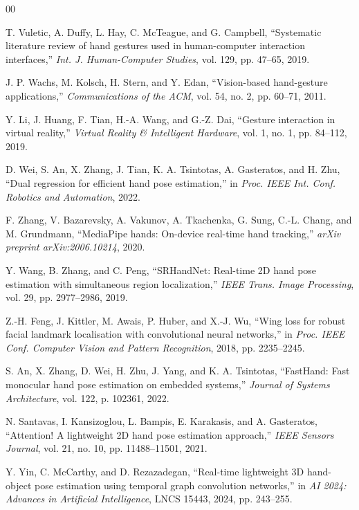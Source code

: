 ﻿\documentclass[10pt,letterpaper]{article}
\begin{document}
\clearpage
\begin{thebibliography}{00}

T. Vuletic, A. Duffy, L. Hay, C. McTeague, and G. Campbell, ``Systematic literature review of hand gestures used in human-computer interaction interfaces,'' \emph{Int. J. Human-Computer Studies}, vol. 129, pp. 47--65, 2019.

J. P. Wachs, M. Kolsch, H. Stern, and Y. Edan, ``Vision-based hand-gesture applications,'' \emph{Communications of the ACM}, vol. 54, no. 2, pp. 60--71, 2011.

Y. Li, J. Huang, F. Tian, H.-A. Wang, and G.-Z. Dai, ``Gesture interaction in virtual reality,'' \emph{Virtual Reality \& Intelligent Hardware}, vol. 1, no. 1, pp. 84--112, 2019.

D. Wei, S. An, X. Zhang, J. Tian, K. A. Tsintotas, A. Gasteratos, and H. Zhu, ``Dual regression for efficient hand pose estimation,'' in \emph{Proc. IEEE Int. Conf. Robotics and Automation}, 2022.

F. Zhang, V. Bazarevsky, A. Vakunov, A. Tkachenka, G. Sung, C.-L. Chang, and M. Grundmann, ``MediaPipe hands: On-device real-time hand tracking,'' \emph{arXiv preprint arXiv:2006.10214}, 2020.

Y. Wang, B. Zhang, and C. Peng, ``SRHandNet: Real-time 2D hand pose estimation with simultaneous region localization,'' \emph{IEEE Trans. Image Processing}, vol. 29, pp. 2977--2986, 2019.

Z.-H. Feng, J. Kittler, M. Awais, P. Huber, and X.-J. Wu, ``Wing loss for robust facial landmark localisation with convolutional neural networks,'' in \emph{Proc. IEEE Conf. Computer Vision and Pattern Recognition}, 2018, pp. 2235--2245.

S. An, X. Zhang, D. Wei, H. Zhu, J. Yang, and K. A. Tsintotas, ``FastHand: Fast monocular hand pose estimation on embedded systems,'' \emph{Journal of Systems Architecture}, vol. 122, p. 102361, 2022.

N. Santavas, I. Kansizoglou, L. Bampis, E. Karakasis, and A. Gasteratos, ``Attention! A lightweight 2D hand pose estimation approach,'' \emph{IEEE Sensors Journal}, vol. 21, no. 10, pp. 11488--11501, 2021.

Y. Yin, C. McCarthy, and D. Rezazadegan, ``Real-time lightweight 3D hand-object pose estimation using temporal graph convolution networks,'' in \emph{AI 2024: Advances in Artificial Intelligence}, LNCS 15443, 2024, pp. 243--255.


\end{thebibliography}
\end{document}
